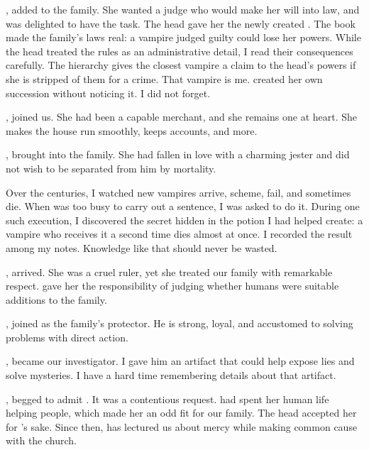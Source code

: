 {,  added  to the family. She wanted a judge who would make her will into law, and  was delighted to have the task. The head gave her the newly created . The book made the family's laws real: a vampire judged guilty could lose her powers. While the head treated the rules as an administrative detail, I read their consequences carefully. The hierarchy gives the closest vampire a claim to the head's powers if she is stripped of them for a crime. That vampire is me.  created her own succession without noticing it. I did not forget.

,  joined us. She had been a capable merchant, and she remains one at heart. She makes the house run smoothly, keeps accounts, and more.

,  brought  into the family. She had fallen in love with a charming jester and did not wish to be separated from him by mortality.

Over the centuries, I watched new vampires arrive, scheme, fail, and sometimes die. When  was too busy to carry out a sentence, I was asked to do it. During one such execution, I discovered the secret hidden in the potion I had helped create: a vampire who receives it a second time dies almost at once. I recorded the result among my notes. Knowledge like that should never be wasted.

,  arrived. She was a cruel ruler, yet she treated our family with remarkable respect.  gave her the responsibility of judging whether humans were suitable additions to the family.

,  joined as the family's protector. He is strong, loyal, and accustomed to solving problems with direct action.

,  became our investigator. I gave him an artifact that could help expose lies and solve mysteries. I have a hard time remembering details about that artifact.

,  begged  to admit . It was a contentious request.  had spent her human life helping people, which made her an odd fit for our family. The head accepted her for 's sake. Since then,  has lectured us about mercy while making common cause with the church. 

}
